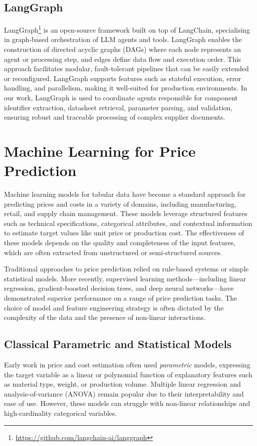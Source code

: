 \subsection{LangGraph}
LangGraph\footnote{\url{https://github.com/langchain-ai/langgraph}} is an open-source framework built on top of LangChain, specialising in graph-based orchestration of LLM agents and tools. LangGraph enables the construction of directed acyclic graphs (DAGs) where each node represents an agent or processing step, and edges define data flow and execution order. This approach facilitates modular, fault-tolerant pipelines that can be easily extended or reconfigured. LangGraph supports features such as stateful execution, error handling, and parallelism, making it well-suited for production environments. In our work, LangGraph is used to coordinate agents responsible for component identifier extraction, datasheet retrieval, parameter parsing, and validation, ensuring robust and traceable processing of complex supplier documents.

\section{Machine Learning for Price Prediction}
Machine learning models for tabular data have become a standard approach for predicting prices and costs in a variety of domains, including manufacturing, retail, and supply chain management. These models leverage structured features such as technical specifications, categorical attributes, and contextual information to estimate target values like unit price or production cost. The effectiveness of these models depends on the quality and completeness of the input features, which are often extracted from unstructured or semi-structured sources.

Traditional approaches to price prediction relied on rule-based systems or simple statistical models. More recently, supervised learning methods—including linear regression, gradient-boosted decision trees, and deep neural networks—have demonstrated superior performance on a range of price prediction tasks. The choice of model and feature engineering strategy is often dictated by the complexity of the data and the presence of non-linear interactions.

\subsection{Classical Parametric and Statistical Models}
Early work in price and cost estimation often used \emph{parametric} models, expressing the target variable as a linear or polynomial function of explanatory features such as material type, weight, or production volume. Multiple linear regression and analysis-of-variance (ANOVA) remain popular due to their interpretability and ease of use. However, these models can struggle with non-linear relationships and high-cardinality categorical variables.

